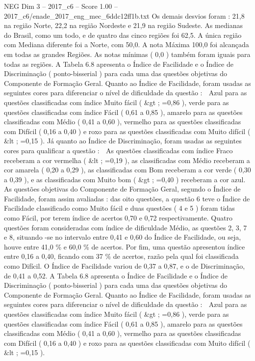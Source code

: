 \begin{textsample}{NEG Dim 3 – 2017\_c6 – Score 1.00 – 2017\_c6/enade\_2017\_eng\_mec\_6ddc12ff1b.txt}
Os demais desvios foram : 21,8 na região Norte, 22,2 na região Nordeste e 21,9 na região Sudeste.
As medianas do Brasil, como um todo, e de quatro das cinco regiões foi 62,5.
A única região com Mediana diferente foi a Norte, com 50,0.
A nota Máxima 100,0 foi alcançada em todas as grandes Regiões.
As notas mínimas ( 0,0 ) também foram iguais para todas as regiões.
A Tabela 6.8 apresenta o Índice de Facilidade e o Índice de Discriminação ( ponto-bisserial ) para cada uma das questões objetivas do Componente de Formação Geral.
Quanto ao Índice de Facilidade, foram usadas as seguintes cores para diferenciar o nível de dificuldade da questão :  Azul para as questões classificadas com índice Muito fácil ( \&gt ; =0,86 ), verde para as questões classificadas com índice Fácil ( 0,61 a 0,85 ), amarelo para as questões classificadas com Médio ( 0,41 a 0,60 ), vermelho para as questões classificadas com Difícil ( 0,16 a 0,40 ) e roxo para as questões classificadas com Muito difícil ( \&lt ; =0,15 ).
Já quanto ao Índice de Discriminação, foram usadas as seguintes cores para qualificar a questão :  As questões classificadas com índice Fraco receberam a cor vermelha ( \&lt ; =0,19 ), as classificadas com Médio receberam a cor amarela ( 0,20 a 0,29 ), as classificadas com Bom receberam a cor verde ( 0,30 a 0,39 ), e as classificadas com Muito bom ( \&gt ; =0,40 ) receberam a cor azul.
As questões objetivas do Componente de Formação Geral, segundo o Índice de Facilidade, foram assim avaliadas : das oito questões, a questão 6 teve o Índice de Facilidade classificado como Muito fácil e duas questões ( 4 e 5 ) foram tidas como Fácil, por terem índice de acertos 0,70 e 0,72 respectivamente.
Quatro questões foram consideradas com índice de dificuldade Médio, as questões 2, 3, 7 e 8, situando -se no intervalo entre 0,41 e 0,60 do Índice de Facilidade, ou seja, houve entre 41,0 \% e 60,0 \% de acertos.
Por fim, uma questão apresentou índice entre 0,16 a 0,40, ficando com 37 \% de acertos, razão pela qual foi classificada como Difícil.
O Índice de Facilidade variou de 0,37 a 0,87, e o de Discriminação, de 0,41 a 0,52.
A Tabela 6.8 apresenta o Índice de Facilidade e o Índice de Discriminação ( ponto-bisserial ) para cada uma das questões objetivas do Componente de Formação Geral.
Quanto ao Índice de Facilidade, foram usadas as seguintes cores para diferenciar o nível de dificuldade da questão :  Azul para as questões classificadas com índice Muito fácil ( \&gt ; =0,86 ), verde para as questões classificadas com índice Fácil ( 0,61 a 0,85 ), amarelo para as questões classificadas com Médio ( 0,41 a 0,60 ), vermelho para as questões classificadas com Difícil ( 0,16 a 0,40 ) e roxo para as questões classificadas com Muito difícil ( \&lt ; =0,15 ).

\end{textsample}
